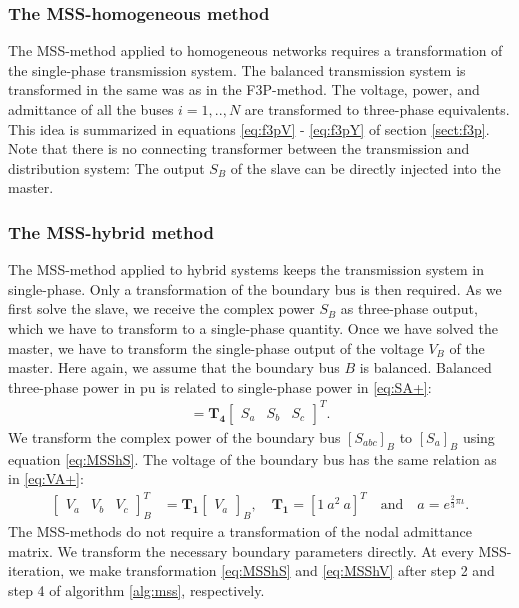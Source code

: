 \documentclass[10pt,journal]{article}
\begin{document}
\subsubsection{{The MSS-homogeneous method}}
The MSS-method applied to homogeneous networks requires a transformation of the single-phase transmission system. The balanced transmission system is transformed in the same was as in the F3P-method. The voltage, power, and admittance of all the buses $i=1,..,N$ are transformed to three-phase equivalents. This idea is summarized in equations \eqref{eq:f3pV} - \eqref{eq:f3pY} of section \ref{sect:f3p}. Note that there is no connecting transformer between the transmission and distribution system: The output $S_B$ of the slave can be directly injected into the master. 

\subsubsection{{The MSS-hybrid method}}
The MSS-method applied to hybrid systems keeps the transmission system in single-phase. Only a transformation of the boundary bus is then required. \newline
As we first solve the slave, we receive the complex power $S_B$ as three-phase output, which we have to transform to a single-phase quantity. Once we have solved the master, we have to transform the single-phase output of the voltage $V_B$ of the master. Here again, we assume that the boundary bus $B$ is balanced. Balanced three-phase power in pu is related to single-phase power in \eqref{eq:SA+}:
\begin{align}
    [S_a] = \mathbf{T_4}\begin{bmatrix}S_a & S_b & S_c \end{bmatrix}^T.
\label{eq:MSShS}\end{align}
We transform the complex power of the boundary bus $[S_{abc}]_B$ to $[S_a]_B$ using equation \eqref{eq:MSShS}. \newline 
The voltage of the boundary bus has the same relation as in \eqref{eq:VA+}: 
\begin{align}
    \begin{bmatrix}V_a & V_b & V_c\end{bmatrix}^T_B &= \mathbf{T_1}\begin{bmatrix}V_a\end{bmatrix}_B,\quad 
     \mathbf{T_1} = [1\ a^2\ a]^T\quad\mbox{and}\quad a = e^{\frac{2}{3}\pi\iota}.\label{eq:MSShV}
    \end{align}
The MSS-methods do not require a transformation of the nodal admittance matrix. We transform the necessary boundary parameters directly. At every MSS-iteration, we make transformation \eqref{eq:MSShS} and \eqref{eq:MSShV} after step 2 and step 4 of algorithm \ref{alg:mss}, respectively. 
\end{document}
